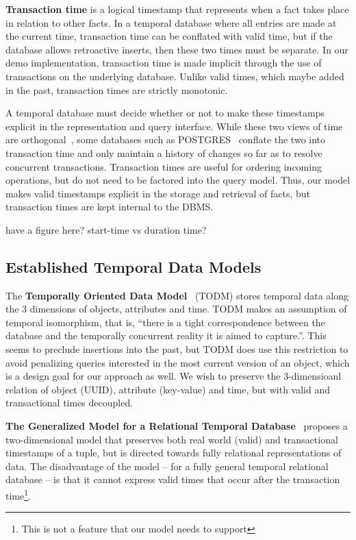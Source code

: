 \textbf{Transaction time} is a logical timestamp that represents when a fact
takes place in relation to other facts. In a temporal database where all
entries are made at the current time, transaction time can be conflated with
valid time, but if the database allows retroactive inserts, then these two
times must be separate. In our demo implementation, transaction time is made
implicit through the use of transactions on the underlying database. Unlike
valid times, which maybe added in the past, transaction times are strictly
monotonic.

A temporal database must decide whether or not to make these timestamps
explicit in the representation and query interface.  While these two views of
time are orthogonal~\cite{snodgrass1986temporal}, some databases such as
POSTGRES~\cite{stonebraker1990implementation} conflate the two into transaction
time and only maintain a history of changes so far as to resolve concurrent
transactions. Transaction times are useful for ordering incoming operations,
but do not need to be factored into the query model. Thus, our model makes
valid timestamps explicit in the storage and retrieval of facts, but
transaction times are kept internal to the DBMS.

have a figure here? start-time vs duration time?
\fi

\subsection{Established Temporal Data Models}

The \textbf{Temporally Oriented Data Model}~\cite{ariav1986temporally} (TODM)
stores temporal data along the 3 dimensions of objects, attributes and
time. TODM makes an assumption of temporal isomorphism, that is, ``there is a tight
correspondence between the database and the temporally concurrent reality it is
aimed to capture.''\cite{ariav1986temporally}. This seems to preclude
insertions into the past, but TODM does use this restriction to avoid
penalizing queries interested in the most current version of an object, which
is a design goal for our approach as well. We wish to preserve the 3-dimensioanl
relation of object (UUID), attribute (key-value) and time, but with valid
and transactional times decoupled.

\textbf{The Generalized Model for a Relational Temporal Database}~\cite{gadia1988generalized} proposes a two-dimensional
model that preserves both real world (valid) and transactional timestamps of a
tuple, but is directed towards fully relational representations of data.  The
disadvantage of the model -- for a fully general temporal relational database
-- is that it cannot express valid times that occur after the transaction
time\footnote{This is not a feature that our model needs to support}.

